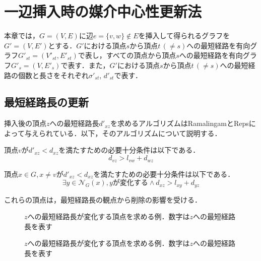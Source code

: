 \chapter{一辺挿入時の媒介中心性更新法}
\label{chap:update-bc-on-insert}
本章では，$G=(V,E)$に辺$e=\{v,w\} \not\in E$を挿入して得られるグラフを
$G'=(V,E')$とする．$G'$における頂点$s$から頂点$t\,(\neq s)$への最短経路を有向グラフ$G'_{st}=(V'_{st},E'_{st})$で表し，すべての頂点から頂点$s$への最短経路を有向グラフ$G'_s=(V,E'_s)$で表す．また，$G'$における頂点$s$から頂点$t\,(\neq s)$への最短経路の個数と長さをそれぞれ$\sigma'_{st}$, $d'_{st}$で表す．

\section{最短経路長の更新}
\label{sect:update-dist-on-insert}

挿入後の頂点$z$への最短経路長$d'_{xz}$を求めるアルゴリズムはRamalingamとRepsによって与えられている．以下，そのアルゴリズムについて説明する．

\begin{lemma-without-proof}
  頂点$v$が$d'_{xz}<d_{xz}$を満たすための必要十分条件は以下である．
  \begin{equation*}
    d_{vz}>l_{vw}+d_{wz}
  \end{equation*}
\end{lemma-without-proof}

\begin{lemma-without-proof}
  頂点$x\in G,x\neq v$が$d'_{xz}<d_{xz}$を満たすための必要十分条件は以下である．
  \begin{equation*}
    \exists y\in\mathcal{N}_G(x),yが変化する\land d_{xz}>l_{xy}+d_{yz}
  \end{equation*}
\end{lemma-without-proof}

これらの頂点は，最短経路長の観点から削除の影響を受ける．

\begin{figure}[tb]
  \centering
  \def\svgwidth{.35\linewidth}
  
  \caption{$z$への最短経路長が変化する頂点を求める例．数字は$z$への最短経路長を表す}
  \label{fig:incremental-dist-idea-1}
\end{figure}

\begin{figure}[tb]
  \centering
  \def\svgwidth{.35\linewidth}
  
  \caption{$z$への最短経路長が変化する頂点を求める例．数字は$z$への最短経路長を表す}
  \label{fig:incremental-dist-idea-2}
\end{figure}

